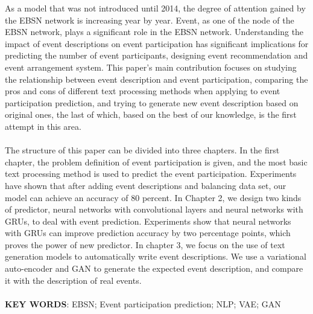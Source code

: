 \documentclass[12pt]{template}
\begin{document}
\begin{myparindent}{0pt}
As a model that was not introduced until 2014, the degree of attention gained by the EBSN network is increasing year by year. Event, as one of the node of the EBSN network, plays a significant role in the EBSN network. Understanding the impact of event descriptions on event participation has significant implications for predicting the number of event participants, designing event recommendation and event arrangement system. This paper's main contribution focuses on studying the relationship between event description and event participation, comparing the pros and cons of different text processing methods when applying to event participation prediction, and trying to generate new event description based on original ones, the last of which, based on the best of our knowledge, is the first attempt in this area.
\\
\\
The structure of this paper can be divided into three chapters. In the first chapter, the problem definition of event participation is given, and the most basic text processing method is used to predict the event participation. Experiments have shown that after adding event descriptions and balancing data set, our model can achieve an accuracy of 80 percent. In Chapter 2, we design two kinds of predictor, neural networks with convolutional layers and neural networks with GRUs, to deal with event prediction. Experiments show that neural networks with GRUs can improve prediction accuracy by two percentage points, which proves the power of new predictor. In chapter 3, we focus on the use of text generation models to automatically write event descriptions. We use a variational auto-encoder and GAN to generate the expected event description, and compare it with the description of real events.
\\
\\
\textbf{KEY WORDS}: EBSN; Event participation prediction; NLP; VAE; GAN 
\end{myparindent}
\end{document}
